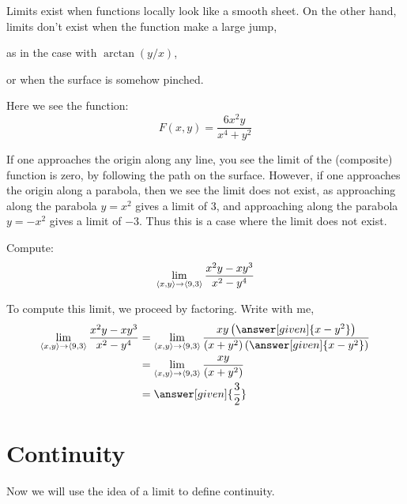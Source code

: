 \documentclass{ximera}
\begin{document}
Limits exist when functions locally look like a smooth sheet. On the
other hand, limits don't exist when the function make a large jump,
\begin{onlineOnly}
  as in the case with $\arctan(y/x)$,
  \begin{center}
  \end{center}
\end{onlineOnly}
or when the surface is somehow pinched.
\begin{onlineOnly}
  Here we see the function:
  \[
  F(x,y) = \frac{6x^2y}{x^4+y^2}
  \]
  \begin{center}
  \end{center}
  If one approaches the origin along any line, you see the limit of
  the (composite) function is zero, by following the path on the
  surface. However, if one approaches the origin along a parabola,
  then we see the limit does not exist, as approaching along the
  parabola $y=x^2$ gives a limit of $3$, and approaching along the
  parabola $y=-x^2$ gives a limit of $-3$. Thus this is a case where
  the limit does not exist.
\end{onlineOnly}



\begin{example}
  Compute:
  \[
  \lim_{\left\langle x,y\right\rangle\to\left\langle 9,3\right\rangle} \frac{x^2y-xy^3}{x^2-y^4}
  \]
  \begin{explanation}
    To compute this limit, we proceed by factoring. Write with me,
    \begin{align*}
      \lim_{\vector{x,y}\to\vector{9,3}} \frac{x^2y-xy^3}{x^2-y^4}
      &=\lim_{\vector{x,y}\to\vector{9,3}} \frac{xy\left(\answer[given]{x-y^2}\right)}{(x+y^2)\left(\answer[given]{x-y^2}\right)}\\
      &=\lim_{\vector{x,y}\to\vector{9,3}} \frac{xy}{(x+y^2)}\\
      &=\answer[given]{\frac{3}{2}}
    \end{align*}
  \end{explanation}
\end{example}



\section{Continuity}

Now we will use the idea of a limit to define continuity.
\end{document}
